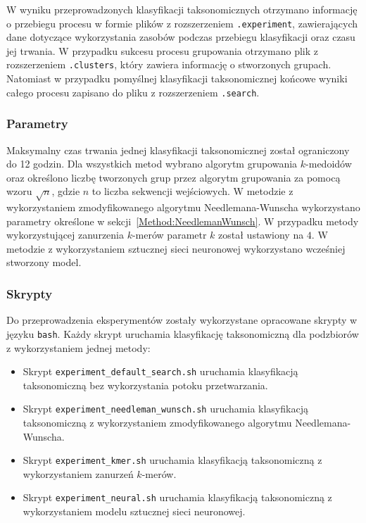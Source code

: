         W wyniku przeprowadzonych klasyfikacji taksonomicznych otrzymano informację o przebiegu procesu w formie plików z rozszerzeniem \texttt{.experiment}, zawierających dane dotyczące wykorzystania zasobów podczas przebiegu klasyfikacji oraz czasu jej trwania. W przypadku sukcesu procesu grupowania otrzymano plik z rozszerzeniem \texttt{.clusters}, który zawiera informację o stworzonych grupach. Natomiast w przypadku pomyślnej klasyfikacji taksonomicznej końcowe wyniki całego procesu zapisano do pliku z rozszerzeniem \texttt{.search}.

        \subsubsection{Parametry}

            Maksymalny czas trwania jednej klasyfikacji taksonomicznej został ograniczony do 12 godzin. Dla wszystkich metod wybrano algorytm grupowania $k$-medoidów oraz określono liczbę tworzonych grup przez algorytm grupowania za pomocą wzoru $\sqrt{n}$, gdzie $n$ to liczba sekwencji wejściowych. W metodzie z wykorzystaniem zmodyfikowanego algorytmu Needlemana-Wunscha wykorzystano parametry określone w sekcji~\ref{Method:NeedlemanWunsch}. W przypadku metody wykorzystującej zanurzenia $k$-merów parametr $k$ został ustawiony na $4$. W metodzie z wykorzystaniem sztucznej sieci neuronowej wykorzystano wcześniej stworzony model.

        \subsubsection{Skrypty}

            Do przeprowadzenia eksperymentów zostały wykorzystane opracowane skrypty w języku \texttt{bash}. Każdy skrypt uruchamia klasyfikację taksonomiczną dla podzbiorów z wykorzystaniem jednej metody:

            \begin{itemize}
                \item {
                    Skrypt \texttt{experiment\_default\_search.sh} uruchamia klasyfikacją taksonomiczną bez wykorzystania potoku przetwarzania.
                }
                \item {
                    Skrypt \texttt{experiment\_needleman\_wunsch.sh} uruchamia klasyfikacją taksonomiczną z wykorzystaniem zmodyfikowanego algorytmu Needlemana-Wunscha.
                }
                \item {
                    Skrypt \texttt{experiment\_kmer.sh} uruchamia klasyfikacją taksonomiczną z wykorzystaniem zanurzeń $k$-merów.
                }
                \item {
                    Skrypt \texttt{experiment\_neural.sh} uruchamia klasyfikacją taksonomiczną z wykorzystaniem modelu sztucznej sieci neuronowej.
                }
            \end{itemize}

